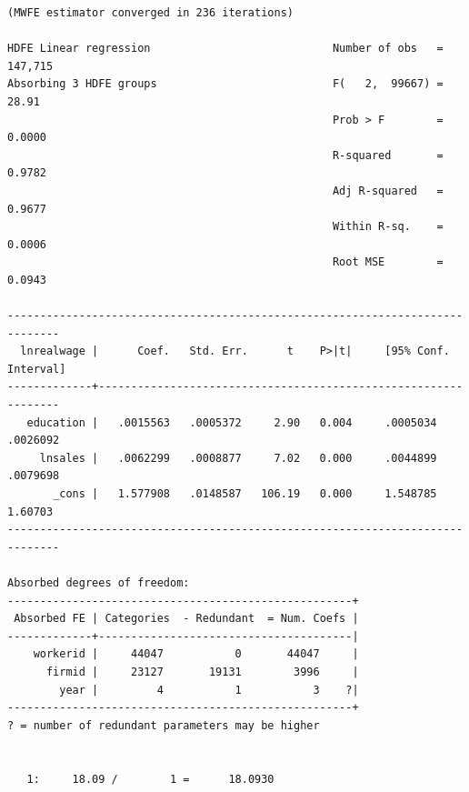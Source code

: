 \documentclass[
  12pt,
]{article}
\newenvironment{Shaded}{\begin{snugshade}}{\end{snugshade}}
\newcommand{\FunctionTok}[1]{\textcolor[rgb]{0.00,0.00,0.00}{#1}}
\newcommand{\NormalTok}[1]{#1}
\newcommand{\OtherTok}[1]{\textcolor[rgb]{0.56,0.35,0.01}{#1}}
\newcommand{\SpecialCharTok}[1]{\textcolor[rgb]{0.00,0.00,0.00}{#1}}
\newcommand{\StringTok}[1]{\textcolor[rgb]{0.31,0.60,0.02}{#1}}
\begin{document}
\begin{verbatim}
(MWFE estimator converged in 236 iterations)

HDFE Linear regression                            Number of obs   =    147,715
Absorbing 3 HDFE groups                           F(   2,  99667) =      28.91
                                                  Prob > F        =     0.0000
                                                  R-squared       =     0.9782
                                                  Adj R-squared   =     0.9677
                                                  Within R-sq.    =     0.0006
                                                  Root MSE        =     0.0943

------------------------------------------------------------------------------
  lnrealwage |      Coef.   Std. Err.      t    P>|t|     [95% Conf. Interval]
-------------+----------------------------------------------------------------
   education |   .0015563   .0005372     2.90   0.004     .0005034    .0026092
     lnsales |   .0062299   .0008877     7.02   0.000     .0044899    .0079698
       _cons |   1.577908   .0148587   106.19   0.000     1.548785     1.60703
------------------------------------------------------------------------------

Absorbed degrees of freedom:
-----------------------------------------------------+
 Absorbed FE | Categories  - Redundant  = Num. Coefs |
-------------+---------------------------------------|
    workerid |     44047           0       44047     |
      firmid |     23127       19131        3996     |
        year |         4           1           3    ?|
-----------------------------------------------------+
? = number of redundant parameters may be higher


   1:     18.09 /        1 =      18.0930
\end{verbatim}

\begin{Shaded}
\end{Shaded}
\end{document}

